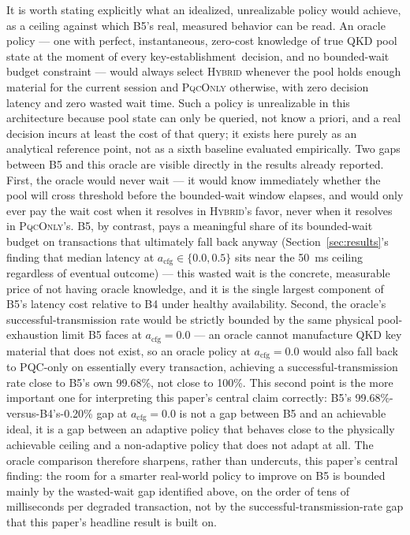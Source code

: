 \documentclass[journal]{IEEEtran}
\newcommand{\keyest}{key-establishment}
\newcommand{\acfg}{\ensuremath{a_{\text{cfg}}}}
\begin{document}
It is worth stating explicitly what an idealized, unrealizable policy would achieve, as a ceiling against which B5's real, measured behavior can be read. An oracle policy --- one with perfect, instantaneous, zero-cost knowledge of true QKD pool state at the moment of every \keyest\ decision, and no bounded-wait budget constraint --- would always select \textsc{Hybrid} whenever the pool holds enough material for the current session and \textsc{PqcOnly} otherwise, with zero decision latency and zero wasted wait time. Such a policy is unrealizable in this architecture because pool state can only be queried, not know a priori, and a real decision incurs at least the cost of that query; it exists here purely as an analytical reference point, not as a sixth baseline evaluated empirically. Two gaps between B5 and this oracle are visible directly in the results already reported. First, the oracle would never wait --- it would know immediately whether the pool will cross threshold before the bounded-wait window elapses, and would only ever pay the wait cost when it resolves in \textsc{Hybrid}'s favor, never when it resolves in \textsc{PqcOnly}'s. B5, by contrast, pays a meaningful share of its bounded-wait budget on transactions that ultimately fall back anyway (Section~\ref{sec:results}'s finding that median latency at $\acfg \in \{0.0, 0.5\}$ sits near the \qty{50}{ms} ceiling regardless of eventual outcome) --- this wasted wait is the concrete, measurable price of not having oracle knowledge, and it is the single largest component of B5's latency cost relative to B4 under healthy availability. Second, the oracle's successful-transmission rate would be strictly bounded by the same physical pool-exhaustion limit B5 faces at $\acfg=0.0$ --- an oracle cannot manufacture QKD key material that does not exist, so an oracle policy at $\acfg=0.0$ would also fall back to PQC-only on essentially every transaction, achieving a successful-transmission rate close to B5's own 99.68\%, not close to 100\%. This second point is the more important one for interpreting this paper's central claim correctly: B5's 99.68\%-versus-B4's-0.20\% gap at $\acfg=0.0$ is not a gap between B5 and an achievable ideal, it is a gap between an adaptive policy that behaves close to the physically achievable ceiling and a non-adaptive policy that does not adapt at all. The oracle comparison therefore sharpens, rather than undercuts, this paper's central finding: the room for a smarter real-world policy to improve on B5 is bounded mainly by the wasted-wait gap identified above, on the order of tens of milliseconds per degraded transaction, not by the successful-transmission-rate gap that this paper's headline result is built on.
\end{document}
